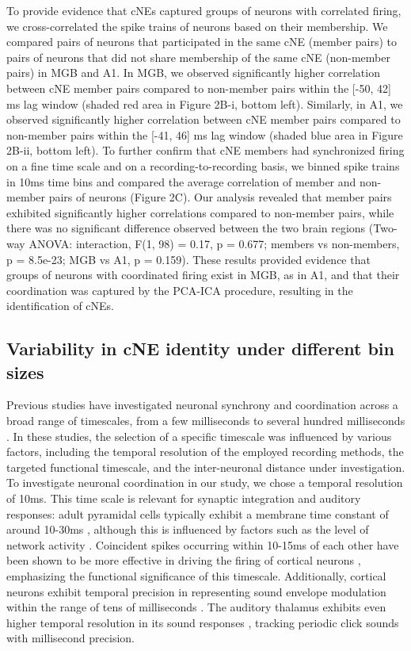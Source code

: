 \documentclass[11pt]{article}
\begin{document}
To provide evidence that cNEs captured groups of neurons with correlated firing, we cross-correlated the spike trains of neurons based on their membership. We compared pairs of neurons that participated in the same cNE (member pairs) to pairs of neurons that did not share membership of the same cNE (non-member pairs) in MGB and A1. In MGB, we observed significantly higher correlation between cNE member pairs compared to non-member pairs within the [-50, 42] ms lag window (shaded red area in Figure 2B-i, bottom left). Similarly, in A1, we observed significantly higher correlation between cNE member pairs compared to non-member pairs within the [-41, 46] ms lag window (shaded blue area in Figure 2B-ii, bottom left). To further confirm that cNE members had synchronized firing on a fine time scale and on a recording-to-recording basis, we binned spike trains in 10ms time bins and compared the average correlation of member and non-member pairs of neurons (Figure 2C). Our analysis revealed that member pairs exhibited significantly higher correlations compared to non-member pairs, while there was no significant difference observed between the two brain regions (Two-way ANOVA: interaction, F(1, 98) = 0.17, p = 0.677; members vs non-members, p = 8.5e-23; MGB vs A1, p = 0.159). These results provided evidence that groups of neurons with coordinated firing exist in MGB, as in A1, and that their coordination was captured by the PCA-ICA procedure, resulting in the identification of cNEs.

\subsection*{Variability in cNE identity under different bin sizes}
Previous studies have investigated neuronal synchrony and coordination across a broad range of timescales, from a few milliseconds \citep{lankarany2019, Shahidi2019, El-Gaby2021} to several hundred milliseconds \citep{miller2014visual, tremblay2015attentional, Filipchuk2022}. In these studies, the selection of a specific timescale was influenced by various factors, including the temporal resolution of the employed recording methods, the targeted functional timescale, and the inter-neuronal distance under investigation. To investigate neuronal coordination in our study, we chose a temporal resolution of 10ms. This time scale is relevant for synaptic integration and auditory responses: adult pyramidal cells typically exhibit a membrane time constant of around 10-30ms \citep{koch1996brief, leger2005synaptic, spruston1992, zhang2004maturation}, although this is influenced by factors such as the level of network activity \citep{leger2005synaptic}. Coincident spikes occurring within 10-15ms of each other have been shown to be more effective in driving the firing of cortical neurons \citep{usrey2000synaptic}, emphasizing the functional significance of this timescale. Additionally, cortical neurons exhibit temporal precision in representing sound envelope modulation within the range of tens of milliseconds \citep{hoglen2018amplitude}. The auditory thalamus exhibits even higher temporal resolution in its sound responses \citep{bartlett2007neural}, tracking periodic click sounds with millisecond precision.
\end{document}
